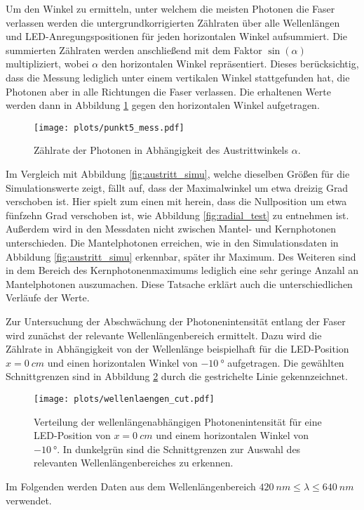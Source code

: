 Um den Winkel zu ermitteln, unter welchem die meisten Photonen die Faser verlassen werden die untergrundkorrigierten Zählraten über alle Wellenlängen und LED-Anregungspositionen für jeden horizontalen Winkel aufsummiert. Die summierten Zählraten werden anschließend mit dem Faktor $\sin(\alpha)$ multipliziert, wobei $\alpha$ den horizontalen Winkel repräsentiert. Dieses berücksichtig, dass die Messung lediglich unter einem vertikalen Winkel stattgefunden hat, die Photonen aber in alle Richtungen die Faser verlassen.
Die erhaltenen Werte werden dann in Abbildung \ref{fig:Punkt5} gegen den horizontalen Winkel aufgetragen.
\begin{figure}
    \centering
    \texttt{[image: plots/punkt5\_mess.pdf]}
    \caption{Zählrate der Photonen in Abhängigkeit des Austrittwinkels $\alpha$.}
    \label{fig:Punkt5}
\end{figure}
\FloatBarrier
Im Vergleich mit Abbildung \ref{fig:austritt_simu}, welche dieselben Größen für die Simulationswerte zeigt, fällt auf, dass der Maximalwinkel um etwa dreizig Grad verschoben ist. Hier spielt zum einen mit herein, dass die Nullposition um etwa fünfzehn Grad verschoben ist, wie Abbildung \ref{fig:radial_test} zu entnehmen ist. Außerdem wird in den Messdaten nicht zwischen Mantel- und Kernphotonen unterschieden. Die Mantelphotonen erreichen, wie in den Simulationsdaten in Abbildung \ref{fig:austritt_simu} erkennbar, später ihr Maximum. Des Weiteren sind in dem Bereich des Kernphotonenmaximums lediglich eine sehr geringe Anzahl an Mantelphotonen auszumachen. Diese Tatsache erklärt auch die unterschiedlichen Verläufe der Werte.

Zur Untersuchung der Abschwächung der Photonenintensität entlang der Faser wird zunächst der relevante Wellenlängenbereich ermittelt. Dazu wird die Zählrate in Abhängigkeit von der Wellenlänge beispielhaft für die LED-Position $x = \SI{0}{cm}$ und einen horizontalen Winkel von $\SI{-10}{°}$ aufgetragen. Die gewählten Schnittgrenzen sind in Abbildung \ref{fig:wellenlaengen_cut} durch die gestrichelte Linie gekennzeichnet.
\begin{figure}
    \centering
    \texttt{[image: plots/wellenlaengen\_cut.pdf]}
    \caption{Verteilung der wellenlängenabhängigen Photonenintensität für eine LED-Position von $x = \SI{0}{cm}$ und einem horizontalen Winkel von $\SI{-10}{°}$. In dunkelgrün sind die Schnittgrenzen zur Auswahl des relevanten Wellenlängenbereiches zu erkennen.}
    \label{fig:wellenlaengen_cut}
\end{figure}
\FloatBarrier
Im Folgenden werden Daten aus dem Wellenlängenbereich $\SI{420}{nm} \leq \lambda \leq \SI{640}{nm}$ verwendet.

